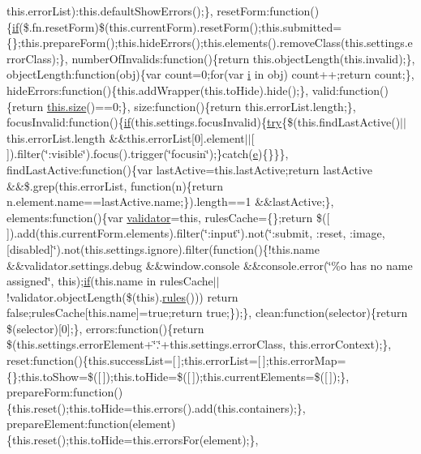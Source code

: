 \begin{DoxyCompactItemize}
this.\+error\+List)\+:this.\+default\+Show\+Errors();\}, reset\+Form\+:function()\{\hyperlink{_scripts_2respond_8min_8js_a93851d60dd037a83509a1757b9ee7b66}{if}(\$.fn.\+reset\+Form)\$(this.\+current\+Form).reset\+Form();this.\+submitted=\{\};this.\+prepare\+Form();this.\+hide\+Errors();this.\+elements().remove\+Class(this.\+settings.\+error\+Class);\}, number\+Of\+Invalids\+:function()\{return this.\+object\+Length(this.\+invalid);\}, object\+Length\+:function(obj)\{var count=0;for(var \hyperlink{jquery_8unobtrusive-ajax_8min_8js_a84da5ff1aa6008a770fb28040f6b0569}{i} in obj) count++;return count;\}, hide\+Errors\+:function()\{this.\+add\+Wrapper(this.\+to\+Hide).hide();\}, valid\+:function()\{return \hyperlink{_scripts_2jquery-1_810_82_8js_afa6806c6ee5e63d5177f1dcc082ba6bc}{this.\+size}()==0;\}, size\+:function()\{return this.\+error\+List.\+length;\}, focus\+Invalid\+:function()\{\hyperlink{_scripts_2respond_8min_8js_a93851d60dd037a83509a1757b9ee7b66}{if}(this.\+settings.\+focus\+Invalid)\{\hyperlink{_scripts_2jquery-1_810_82_8js_abe4cc9788f52e49485473dc699537388}{try}\{\$(this.\+find\+Last\+Active()$\vert$$\vert$this.\+error\+List.\+length \&\&this.\+error\+List\mbox{[}0\mbox{]}.element$\vert$$\vert$\mbox{[}$\,$\mbox{]}).filter(\char`\"{}\+:visible\char`\"{}).focus().trigger(\char`\"{}focusin\char`\"{});\}catch(\hyperlink{jquery_8unobtrusive-ajax_8min_8js_a1bbdb559c9d41205c42f84b233650eb3}{e})\{\}\}\}, find\+Last\+Active\+:function()\{var last\+Active=this.\+last\+Active;return last\+Active \&\&\$.grep(this.\+error\+List, function(n)\{return n.\+element.\+name==last\+Active.\+name;\}).length==1 \&\&last\+Active;\}, elements\+:function()\{var \hyperlink{_scripts_2jquery_8validate_8js_a2dc8272bb221cdffcccbd20db038f172}{validator}=this, rules\+Cache=\{\};return \$(\mbox{[}$\,$\mbox{]}).add(this.\+current\+Form.\+elements).filter(\char`\"{}\+:input\char`\"{}).not(\char`\"{}\+:submit, \+:reset, \+:image, \mbox{[}disabled\mbox{]}\char`\"{}).not(this.\+settings.\+ignore).filter(function()\{!this.\+name \&\&validator.\+settings.\+debug \&\&window.\+console \&\&console.\+error(\char`\"{}\%o has no name assigned\char`\"{}, this);\hyperlink{_scripts_2respond_8min_8js_a93851d60dd037a83509a1757b9ee7b66}{if}(this.\+name in rules\+Cache$\vert$$\vert$!validator.\+object\+Length(\$(this).\hyperlink{_scripts_2respond_8js_ada87c2e257bc5ff6e77cdbc23ed986a3}{rules}())) return false;rules\+Cache\mbox{[}this.\+name\mbox{]}=true;return true;\});\}, clean\+:function(selector)\{return \$(selector)\mbox{[}0\mbox{]};\}, errors\+:function()\{return \$(this.\+settings.\+error\+Element+\char`\"{}.\char`\"{}+this.\+settings.\+error\+Class, this.\+error\+Context);\}, reset\+:function()\{this.\+success\+List=\mbox{[}$\,$\mbox{]};this.\+error\+List=\mbox{[}$\,$\mbox{]};this.\+error\+Map=\{\};this.\+to\+Show=\$(\mbox{[}$\,$\mbox{]});this.\+to\+Hide=\$(\mbox{[}$\,$\mbox{]});this.\+current\+Elements=\$(\mbox{[}$\,$\mbox{]});\}, prepare\+Form\+:function()\{this.\+reset();this.\+to\+Hide=this.\+errors().add(this.\+containers);\}, prepare\+Element\+:function(element)\{this.\+reset();this.\+to\+Hide=this.\+errors\+For(element);\}, 
\end{DoxyCompactItemize}
